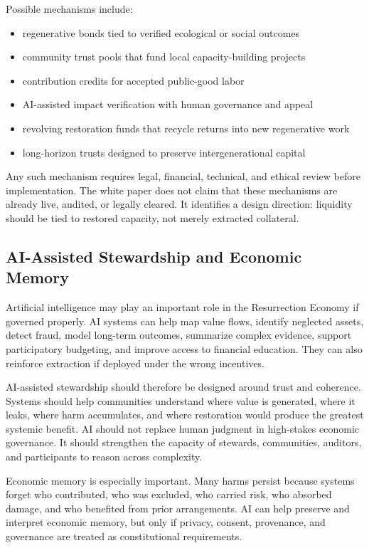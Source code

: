 \documentclass[12pt]{article}
\begin{document}
Possible mechanisms include:

\begin{itemize}
  \item regenerative bonds tied to verified ecological or social outcomes
  \item community trust pools that fund local capacity-building projects
  \item contribution credits for accepted public-good labor
  \item AI-assisted impact verification with human governance and appeal
  \item revolving restoration funds that recycle returns into new regenerative work
  \item long-horizon trusts designed to preserve intergenerational capital
\end{itemize}

Any such mechanism requires legal, financial, technical, and ethical review before implementation. The white paper does not claim that these mechanisms are already live, audited, or legally cleared. It identifies a design direction: liquidity should be tied to restored capacity, not merely extracted collateral.

\subsection{AI-Assisted Stewardship and Economic Memory}

Artificial intelligence may play an important role in the Resurrection Economy if governed properly. AI systems can help map value flows, identify neglected assets, detect fraud, model long-term outcomes, summarize complex evidence, support participatory budgeting, and improve access to financial education. They can also reinforce extraction if deployed under the wrong incentives.

AI-assisted stewardship should therefore be designed around trust and coherence. Systems should help communities understand where value is generated, where it leaks, where harm accumulates, and where restoration would produce the greatest systemic benefit. AI should not replace human judgment in high-stakes economic governance. It should strengthen the capacity of stewards, communities, auditors, and participants to reason across complexity.

Economic memory is especially important. Many harms persist because systems forget who contributed, who was excluded, who carried risk, who absorbed damage, and who benefited from prior arrangements. AI can help preserve and interpret economic memory, but only if privacy, consent, provenance, and governance are treated as constitutional requirements.
\end{document}

